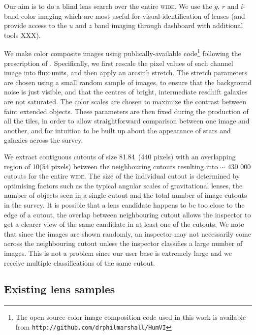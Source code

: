 \documentclass[useAMS,usenatbib,a4paper]{mn2e}
\begin{document}
Our aim is to do a blind lens search over the entire \cfhtls
\textsc{wide}. We use the $g$, $r$ and $i$-band color imaging which are
most useful for visual identification of lenses (and provide access to
the $u$ and $z$ band imaging through dashboard with additional tools
XXX). 

We make color composite images using publically-available
code\footnote{The open source  color image composition code used in this
work is available from \texttt{http://github.com/drphilmarshall/HumVI}}
following the prescription of \citet{Lupton2004}. Specifically, we first
rescale the pixel values of each channel image into flux units, and
then apply an arcsinh stretch. The stretch parameters are chosen
using a small random sample of images, to ensure that the background
noise is just visible, and that the centres of bright, intermediate
resdhift galaxies are not saturated. The color scales are chosen to
maximize the contrast between faint extended objects. These parameters
are then fixed during the production of all the tiles, in order to
allow straightforward comparison between one image and another, and for
intuition to be built up about the appearance of stars and galaxies
across the survey.  

We extract contiguous cutouts of size 81.84\arcsec\ (440 pixels) with an
overlapping region of 10\arcsec (54 pixels) between the neighbouring
cutouts resulting into $\sim$ 430 000 cutouts for the entire \cfhtls
\textsc{wide}. The size of the individual cutout is determined by
optimising factors such as the typical angular scales of gravitational
lenses, the number of objects seen in a single cutout and the total
number of image cutouts in the survey. It is possible that a lens
candidate happens to be too close to the edge of a cutout, the overlap
between neighbouring cutout allows the inspector to get a clearer view
of the same candidate in at least one of the cutouts. We note that since
the images are shown randomly, an inspector may not necessarily come
across the neighbouring cutout unless the inspector classifies a large
number of images. This is not a problem since our user base is extremely
large and we receive multiple classifications of the same cutout. 


\subsection{Existing \cfhtls lens samples}
\label{sec:data:kls}
\end{document}
